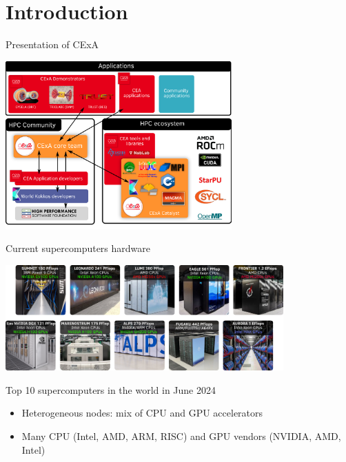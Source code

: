 \documentclass[aspectratio=169]{beamer}
\renewcommand{\caption}[1]{%
    \begin{center}
        \scriptsize #1
    \end{center}%
}
\begin{document}

\section{Introduction}


\begin{frame}{Presentation of CExA}
    \begin{center}
        \includegraphics[width=0.65\textwidth]{cexa.png}
    \end{center}
\end{frame}


\begin{frame}{Current supercomputers hardware}
    \begin{center}
        \includegraphics[width=0.8\textwidth]{top10_super_computers.png}

        \caption{Top 10 supercomputers in the world in June 2024}
    \end{center}
    \begin{itemize}
        \item Heterogeneous nodes: mix of CPU and GPU accelerators
        \item Many CPU (Intel, AMD, ARM, RISC) and GPU vendors (NVIDIA, AMD, Intel)
    \end{itemize}
\end{frame}
\end{document}
